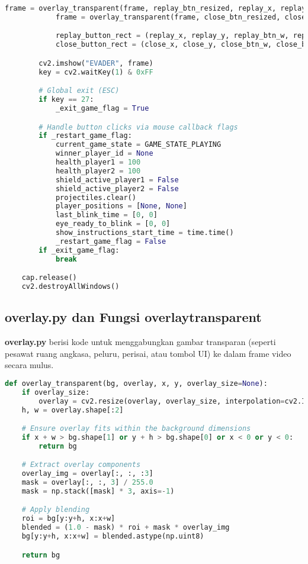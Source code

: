 \documentclass[11pt,a4paper]{article}
\begin{document}
\begin{lstlisting}[language=Python, caption=fungsi main]
            frame = overlay_transparent(frame, replay_btn_resized, replay_x, replay_y)
            frame = overlay_transparent(frame, close_btn_resized, close_x, close_y)

            replay_button_rect = (replay_x, replay_y, replay_btn_w, replay_btn_h)
            close_button_rect = (close_x, close_y, close_btn_w, close_btn_h)

        cv2.imshow("EVADER", frame)
        key = cv2.waitKey(1) & 0xFF

        # Global exit (ESC)
        if key == 27:
            _exit_game_flag = True

        # Handle button clicks via mouse callback flags
        if _restart_game_flag:
            current_game_state = GAME_STATE_PLAYING
            winner_player_id = None
            health_player1 = 100
            health_player2 = 100
            shield_active_player1 = False
            shield_active_player2 = False
            projectiles.clear()
            player_positions = [None, None]
            last_blink_time = [0, 0]
            eye_ready_to_blink = [0, 0]
            show_instructions_start_time = time.time()
            _restart_game_flag = False
        if _exit_game_flag:
            break

    cap.release()
    cv2.destroyAllWindows()
\end{lstlisting}

\subsection{overlay.py dan Fungsi overlay\textunderscore transparent}
\textbf{overlay.py} berisi kode untuk menggabungkan gambar transparan (seperti pesawat ruang angkasa, peluru, perisai, atau tombol UI) ke dalam frame video secara mulus.

\begin{lstlisting}[language=Python, caption=overlay\textunderscore transparent]
def overlay_transparent(bg, overlay, x, y, overlay_size=None):
    if overlay_size:
        overlay = cv2.resize(overlay, overlay_size, interpolation=cv2.INTER_AREA)
    h, w = overlay.shape[:2]

    # Ensure overlay fits within the background dimensions
    if x + w > bg.shape[1] or y + h > bg.shape[0] or x < 0 or y < 0:
        return bg

    # Extract overlay components
    overlay_img = overlay[:, :, :3]
    mask = overlay[:, :, 3] / 255.0
    mask = np.stack([mask] * 3, axis=-1)

    # Apply blending
    roi = bg[y:y+h, x:x+w]
    blended = (1.0 - mask) * roi + mask * overlay_img
    bg[y:y+h, x:x+w] = blended.astype(np.uint8)

    return bg
\end{lstlisting}
\end{document}
